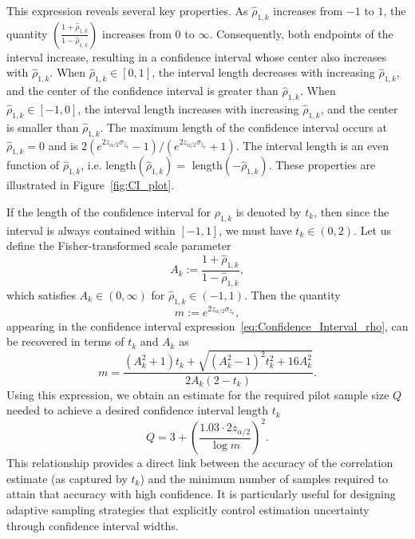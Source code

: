 This expression reveals several key properties. As $\widehat \rho_{1,k}$ increases from $-1$ to $1$, the quantity $\left(\frac{1 + \widehat \rho_{1,k}}{1 - \widehat \rho_{1,k}}\right)$ increases from $0$ to $\infty$. Consequently, both endpoints of the interval increase, resulting in a confidence interval whose center also increases with $\widehat \rho_{1,k}$. When $\widehat \rho_{1,k} \in [0,1]$, the interval length decreases with increasing $\widehat \rho_{1,k}$, and the center of the confidence interval is greater than $\widehat \rho_{1,k}$. When $\widehat \rho_{1,k} \in [-1,0]$, the interval length increases with increasing $\widehat \rho_{1,k}$, and the center is smaller than $\widehat \rho_{1,k}$. The maximum length of the confidence interval occurs at $\widehat \rho_{1,k} = 0$ and is  $2(e^{2z_{\alpha/2}\sigma_{\widehat z_k}}-1)/(e^{2z_{\alpha/2}\sigma_{\widehat z_k}}+1)$. The interval length is an even function of $\widehat \rho_{1,k}$, i.e. length$(\widehat \rho_{1,k})=$ length$(-\widehat \rho_{1,k})$. These properties are illustrated in Figure~\ref{fig:CI_plot}.

If the length of the confidence interval for $\rho_{1,k}$ is denoted by $t_k$, then since the interval is always contained within $[-1, 1]$, we must have $t_k \in (0, 2)$. Let us define the Fisher-transformed scale parameter
\[
A_k := \frac{1 + \widehat \rho_{1,k}}{1 - \widehat \rho_{1,k}},
\]
which satisfies $A_k \in (0, \infty)$ for $\widehat \rho_{1,k} \in (-1, 1)$. Then the quantity
\[
m := e^{2 z_{\alpha/2} \sigma_{\widehat z_k}},
\]
appearing in the confidence interval expression~\eqref{eq:Confidence_Interval_rho}, can be recovered in terms of $t_k$ and $A_k$ as
\[
m = \frac{(A_k^2 + 1) t_k + \sqrt{(A_k^2 - 1)^2 t_k^2 + 16 A_k^2}}{2 A_k (2 - t_k)}.
\]
Using this expression, we obtain an estimate for the required pilot sample size $Q$ needed to achieve a desired confidence interval length $t_k$
\[
Q = 3 + \left( \frac{1.03 \cdot 2 z_{\alpha/2}}{\log m} \right)^2.
\]
This relationship provides a direct link between the accuracy of the correlation estimate (as captured by $t_k$) and the minimum number of samples required to attain that accuracy with high confidence. It is particularly useful for designing adaptive sampling strategies that explicitly control estimation uncertainty through confidence interval widths.



